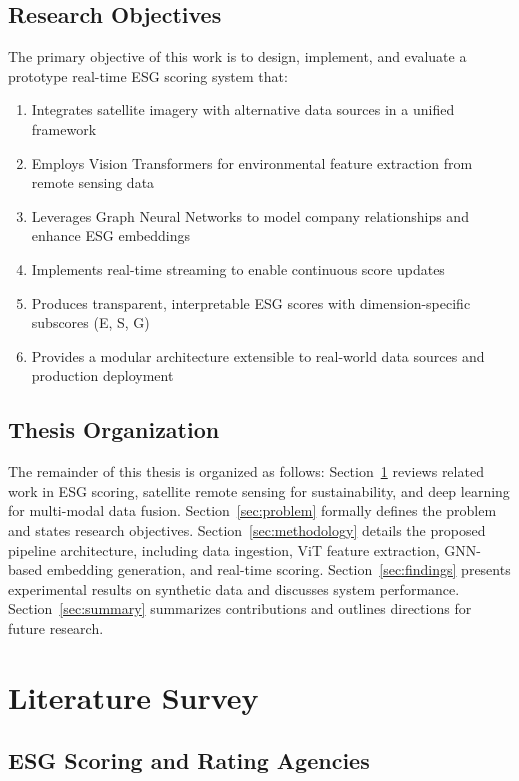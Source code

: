 \subsection{Research Objectives}

The primary objective of this work is to design, implement, and evaluate a prototype real-time ESG scoring system that:

\begin{enumerate}
\item Integrates satellite imagery with alternative data sources in a unified framework
\item Employs Vision Transformers for environmental feature extraction from remote sensing data
\item Leverages Graph Neural Networks to model company relationships and enhance ESG embeddings
\item Implements real-time streaming to enable continuous score updates
\item Produces transparent, interpretable ESG scores with dimension-specific subscores (E, S, G)
\item Provides a modular architecture extensible to real-world data sources and production deployment
\end{enumerate}

\subsection{Thesis Organization}

The remainder of this thesis is organized as follows: Section~\ref{sec:litsurvey} reviews related work in ESG scoring, satellite remote sensing for sustainability, and deep learning for multi-modal data fusion. Section~\ref{sec:problem} formally defines the problem and states research objectives. Section~\ref{sec:methodology} details the proposed pipeline architecture, including data ingestion, ViT feature extraction, GNN-based embedding generation, and real-time scoring. Section~\ref{sec:findings} presents experimental results on synthetic data and discusses system performance. Section~\ref{sec:summary} summarizes contributions and outlines directions for future research.

\clearpage
\section{Literature Survey}
\label{sec:litsurvey}

\subsection{ESG Scoring and Rating Agencies}

